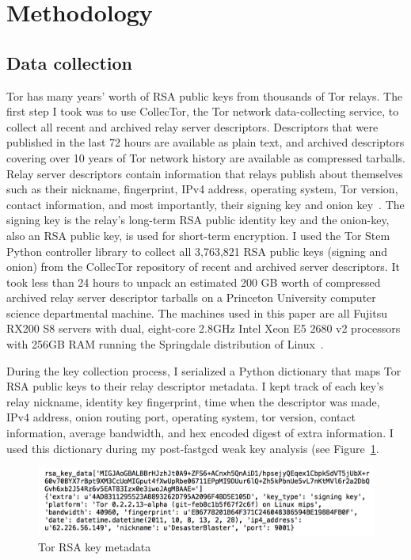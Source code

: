 \section{Methodology}
\label{sec:methodology}

\subsection{Data collection}
Tor has many years' worth of RSA public keys from thousands of Tor relays. The first step I took was to use CollecTor, the Tor network data-collecting service, to collect all recent and archived relay server descriptors. Descriptors that were published in the last 72 hours are available as plain text, and archived descriptors covering over 10 years of Tor network history are available as compressed tarballs. Relay server descriptors contain information that relays publish about themselves such as their nickname, fingerprint, IPv4 address, operating system, Tor version, contact information, and most importantly, their signing key and onion key~\cite{collector}. The signing key is the relay's long-term RSA public identity key and the onion-key, also an RSA public key, is used for short-term encryption. I used the Tor Stem Python controller library to collect all 3,763,821 RSA public keys (signing and onion) from the CollecTor repository of recent and archived server descriptors. It took less than 24 hours to unpack an estimated 200 GB worth of compressed archived relay server descriptor tarballs on a Princeton University computer science departmental machine. The machines used in this paper are all Fujitsu RX200 S8 servers with dual, eight-core 2.8GHz Intel Xeon E5 2680 v2 processors with 256GB RAM running the Springdale distribution of Linux~\cite{cscycles}.

During the key collection process, I serialized a Python dictionary that maps Tor RSA public keys to their relay descriptor metadata. I kept track of each key's relay nickname, identity key fingerprint, time when the descriptor was made, IPv4 address, onion routing port, operating system, tor version, contact information, average bandwidth, and hex encoded digest of extra information. I used this dictionary during my post-fastgcd weak key analysis (see Figure~\ref{rsa-relay}.

\begin{figure}[h]
\centering
\includegraphics[width=\linewidth]{rsa-relay.png}
\caption{Tor RSA key metadata}
\label{rsa-relay}
\end{figure}

